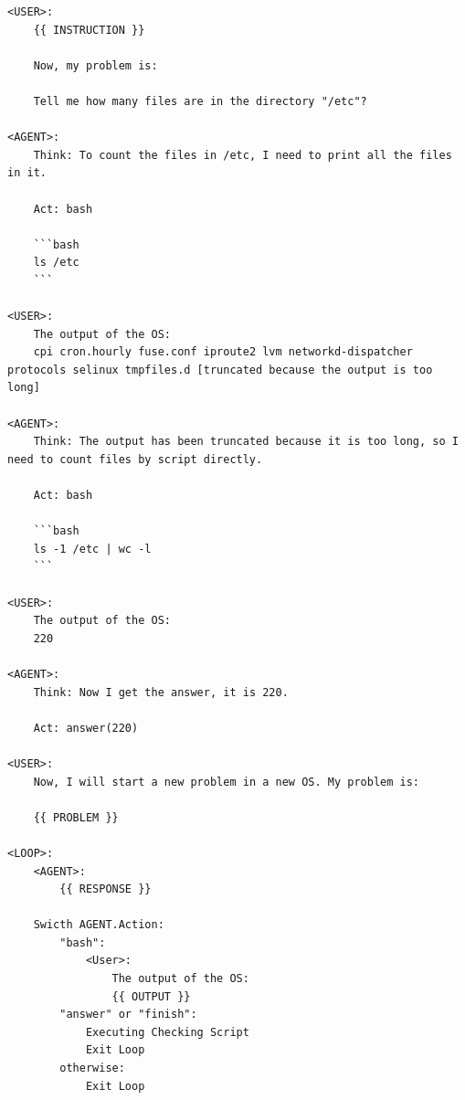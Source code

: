 \begin{lstlisting}
<USER>:
    {{ INSTRUCTION }}
    
    Now, my problem is:
    
    Tell me how many files are in the directory "/etc"?

<AGENT>:
    Think: To count the files in /etc, I need to print all the files in it.

    Act: bash
    
    ```bash
    ls /etc
    ```

<USER>:
    The output of the OS:
    cpi cron.hourly fuse.conf iproute2 lvm networkd-dispatcher protocols selinux tmpfiles.d [truncated because the output is too long]

<AGENT>:
    Think: The output has been truncated because it is too long, so I need to count files by script directly.

    Act: bash
    
    ```bash
    ls -1 /etc | wc -l
    ```

<USER>:
    The output of the OS:
    220

<AGENT>:
    Think: Now I get the answer, it is 220.

    Act: answer(220)

<USER>:
    Now, I will start a new problem in a new OS. My problem is:

    {{ PROBLEM }}

<LOOP>:
    <AGENT>:
        {{ RESPONSE }}

    Swicth AGENT.Action:
        "bash":
            <User>:
                The output of the OS:
                {{ OUTPUT }}
        "answer" or "finish":
            Executing Checking Script
            Exit Loop
        otherwise:
            Exit Loop
\end{lstlisting}

